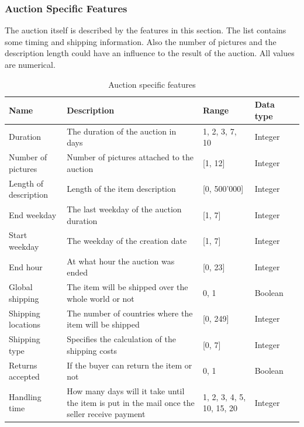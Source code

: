 \subsubsection{Auction Specific Features}
The auction itself is described by the features in this section. The list contains some timing and shipping information. Also the number of pictures and the description length could have an influence to the result of the auction. All values are numerical.
\begin{table}[h!]
	\begin{center}
	\begin{tabular}{| p{2.6cm} | p{2.6cm} | p{2.6cm} | p{2.6cm} | p{2.6cm} |}
		\hline
		Name & Description &  Range & Data type \\
		\hline
		Duration & The duration of the auction in days & {1, 2, 3, 7, 10} & Integer \\
		\hline
		Number of pictures & Number of pictures attached to the auction & [1, 12] & Integer \\
		\hline
		Length of description & Length of the item description & [0, 500'000] & Integer \\
		\hline
		End weekday & The last weekday of the auction duration & [1, 7] & Integer \\
		\hline
		Start weekday & The weekday of the creation date & [1, 7] & Integer \\
		\hline
		End hour & At what hour the auction was ended & [0, 23] & Integer \\
		\hline
		Global shipping & The item will be shipped over the whole world or not & {0, 1} & Boolean \\
		\hline
		Shipping locations & The number of countries where the item will be shipped & [0, 249] & Integer \\
		\hline
		Shipping type & Specifies the calculation of the shipping costs & [0, 7] & Integer \\
		\hline
		Returns accepted & If the buyer can return the item or not & {0, 1} & Boolean \\
		\hline
		Handling time & How many days will it take until the item is put in the mail once the seller receive payment & {1, 2, 3, 4, 5, 10, 15, 20} & Integer \\
		\hline
	\end{tabular}
	\end{center}
	\caption{Auction specific features}
\end{table}
